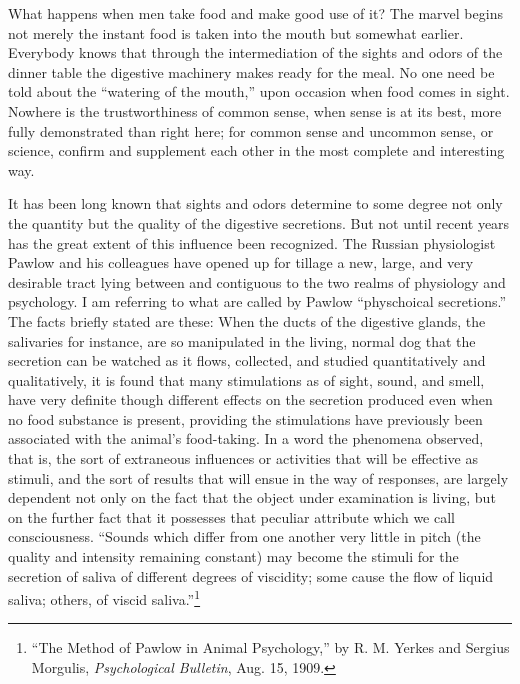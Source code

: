\documentclass[a4paper, 11pt, oneside, polutonikogreek, english]{article}
\begin{document}
What happens when men take food and make good use of it? The marvel begins not merely the instant food is taken into the mouth but somewhat earlier. Everybody knows that through the intermediation of the sights and odors of the dinner table the digestive machinery makes ready for the meal. No one need be told about the ``watering of the mouth,'' upon occasion when food comes in sight. Nowhere is the trustworthiness of common sense, when sense is at its best, more fully demonstrated than right here; for common sense and uncommon sense, or science, confirm and supplement each other in the most complete and interesting way.

It has been long known that sights and odors determine to some degree not only the quantity but the quality of the digestive secretions. But not until recent years has the great extent of this influence been recognized. The Russian physiologist Pawlow and his colleagues have opened up for tillage a new, large, and very desirable tract lying between and contiguous to the two realms of physiology and psychology. I am referring to what are called by Pawlow ``physchoical secretions.'' The facts briefly stated are these: When the ducts of the digestive glands, the salivaries for instance, are so manipulated in the living, normal dog that the secretion can be watched as it flows, collected, and studied quantitatively and qualitatively, it is found that many stimulations as of sight, sound, and smell, have very definite though different effects on the secretion produced even when no food substance is present, providing the stimulations have previously been associated with the animal's food-taking. In a word the phenomena observed, that is, the sort of extraneous influences or activities that will be effective as stimuli, and the sort of results that will ensue in the way of responses, are largely dependent not only on the fact that the object under examination is living, but on the further fact that it possesses that peculiar attribute which we call consciousness. ``Sounds which differ from one another very little in pitch (the quality and intensity remaining constant) may become the stimuli for the secretion of saliva of different degrees of viscidity; some cause the flow of liquid saliva; others, of viscid saliva.''\footnote{``The Method of Pawlow in Animal Psychology,'' by R. M. Yerkes and Sergius Morgulis, \emph{Psychological Bulletin}, Aug. 15, 1909.}
\end{document}
